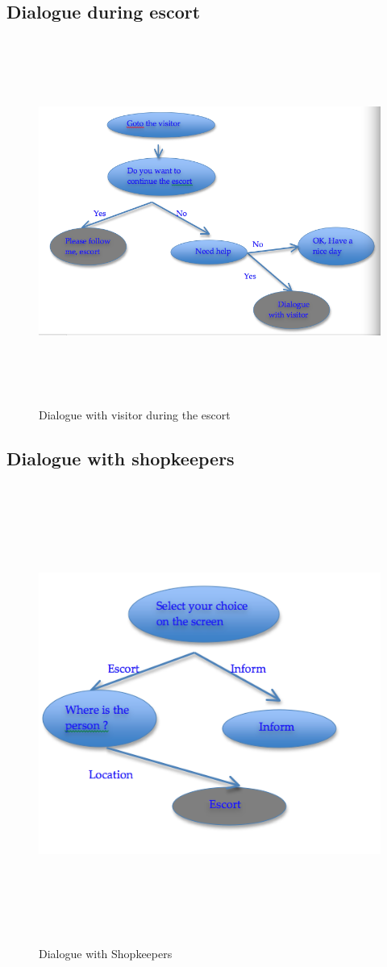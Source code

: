 \documentclass{article}
\begin{document}
\subsection{Dialogue during escort}
\begin{figure}[htbp]
\begin{center}
\includegraphics[height=12cm]{EscortDialogue}
\caption{Dialogue with visitor during the escort}
\label{FigVisitorDialogueII}
\end{center}
\end{figure}
\subsection{Dialogue with shopkeepers}
\begin{figure}[htbp]
\begin{center}
\includegraphics[height=15cm]{VisitorDialogue}
\caption{Dialogue with Shopkeepers}
\label{FigVisitorDialogue}
\end{center}
\end{figure}
\end{document}
